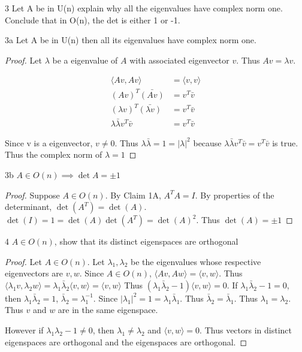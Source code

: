 \documentclass{article}
\newcommand{\abs}[1]{\lvert #1\rvert}
\newcommand{\angles}[1]{\langle{#1}\rangle}
\begin{document}
\bigskip

\begin{PROB}{3}\label{Problem .}
    Let A be in U(n) explain why all the eigenvalues have complex norm one. Conclude that in O(n), the det is either 1 or -1.
\end{PROB}

\begin{claim}{3a}
    Let A be in U(n) then all its eigenvalues have complex norm one.
\end{claim}
\begin{proof}
    Let $\lambda$ be a eigenvalue of $A$ with associated eigenvector $v$. Thus $Av = \lambda v$.

    \begin{align*}{}
        \angles{Av, Av} &= \angles{v, v} \\
        {(Av)}^T \bar{(Av)} &= v^T \bar{v} \\
        (\lambda v)^T \bar{(\lambda v)} &= v^T \bar{v}\\
        \lambda \bar{\lambda} v^T \bar{v} &= v^T \bar{v}
    \end{align*}

    Since v is a eigenvector, $v \neq 0$. Thus $\lambda \bar{\lambda} = 1 = \abs{\lambda}^2$ because $ \lambda \bar{\lambda} v^T \bar{v} = v^T \bar{v}$ is true. Thus the complex norm of $\lambda = 1$
\end{proof}

\begin{claim}{3b}
    $A \in O(n) \implies \det{A} = \pm 1$
\end{claim}
\begin{proof}
    Suppose $A \in O(n)$. By Claim 1A, $A^T A = I$. By properties of the determinant, $\det(A^T) = \det(A)$. $\det(I) = 1 = \det(A) \det(A^T) = \det(A)^2$. Thus $\det(A) = \pm 1$

\end{proof}
\bigskip


\begin{claim}{4}
    $A \in O(n)$, show that its distinct eigenspaces are orthogonal
\end{claim}
\begin{proof}
    Let $A \in O(n)$. Let $\lambda_1, \lambda_2$ be the eigenvalues whose respective eigenvectors are $v, w$. Since $A \in O(n)$, $\angles{Av, Aw} = \angles{v, w}$. Thus $\angles{\lambda_1v, \lambda_2 w} = \lambda_1 \bar \lambda_2 \angles{v, w} = \angles{v, w}$ Thus $(\lambda_1 \bar \lambda_2 - 1)\angles{v, w} = 0$. 
    If $\lambda_1 \bar\lambda_2 - 1 = 0$, then $\lambda_1 \bar\lambda_2 = 1$, $\bar\lambda_2 = \lambda_1^{-1}$. Since $\abs{\lambda_1}^2  = 1 = \lambda_1 \bar \lambda_1$. Thus $\bar\lambda_2 = \bar \lambda_1$. Thus $\lambda_1 = \lambda_2$. Thus $v$ and $w$ are in the same eigenspace. 
    
    However if $\lambda_1 \lambda_2 - 1 \neq 0$, then  $\lambda_1 \neq \lambda_2$ and $\angles{v, w} = 0$. Thus vectors in distinct eigenspaces are orthogonal and the eigenspaces are orthogonal.
\end{proof}
\end{document}
